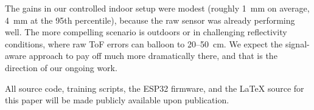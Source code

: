 \documentclass[conference, a4paper]{IEEEtran}
\begin{document}
The gains in our controlled indoor setup were modest (roughly 1~mm on average, 4~mm at the 95th percentile), because the raw sensor was already performing well. The more compelling scenario is outdoors or in challenging reflectivity conditions, where raw ToF errors can balloon to 20--50~cm. We expect the signal-aware approach to pay off much more dramatically there, and that is the direction of our ongoing work.

All source code, training scripts, the ESP32 firmware, and the LaTeX source for this paper will be made publicly available upon publication.



\end{document}
